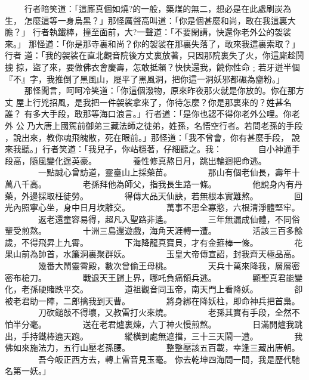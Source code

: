 \begin{pinyinscope}
{　　
行者暗笑道：「這廝真個如燒?的一般，築煤的無二，想必是在此處刷炭為生，
怎麼這等一身烏黑？」那怪厲聲高叫道：「你是個甚麼和尚，敢在我這裏大膽？」
行者執鐵棒，撞至面前，大?一聲道：「不要閑講，快還你老外公的袈裟來。」
那怪道：「你是那寺裏和尚？你的袈裟在那裏失落了，敢來我這裏索取？」行者
道：「我的袈裟在直北觀音院後方丈裏放著，只因那院裏失了火，你這廝趁鬨擄
掠，盜了來，要做佛衣會慶壽，怎敢抵賴？快快還我，饒你性命﹔若牙迸半個
『不』字，我推倒了黑風山，屣平了黑風洞，把你這一洞妖邪都碾為齏粉。」
　　
那怪聞言，呵呵冷笑道：「你這個潑物，原來昨夜那火就是你放的。你在那方丈
屋上行兇招風，是我把一件袈裟拿來了，你待怎麼？你是那裏來的？姓甚名誰？
有多大手段，敢那等海口浪言。」行者道：「是你也認不得你老外公哩。你老外
公 乃大唐上國駕前御弟三藏法師之徒弟，姓孫，名悟空行者。若問老孫的手段
，說出來，教你魂飛魄散，死在眼前。」那怪道：「我不曾會，你有甚麼手段，
說來我聽。」行者笑道：「我兒子，你站穩著，仔細聽之。我：
　　　　自小神通手段高，隨風變化逞英豪。
　　　　養性修真熬日月，跳出輪迴把命逃。
　　　　一點誠心曾訪道，靈臺山上採藥苗。
　　　　那山有個老仙長，壽年十萬八千高。
　　　　老孫拜他為師父，指我長生路一條。
　　　　他說身內有丹藥，外邊採取枉徒勞。
　　　　得傳大品天仙訣，若無根本實難熬。
　　　　回光內照寧心坐，身中日月坎離交。
　　　　萬事不思全寡慾，六根清淨體堅牢。
　　　　返老還童容易得，超凡入聖路非遙。
　　　　三年無漏成仙體，不同俗輩受煎熬。
　　　　十洲三島還遊戲，海角天涯轉一遭。
　　　　活該三百多餘歲，不得飛昇上九霄。
　　　　下海降龍真寶貝，才有金箍棒一條。
　　　　花果山前為帥首，水簾洞裏聚群妖。
　　　　玉皇大帝傳宣詔，封我齊天極品高。
　　　　幾番大鬧靈霄殿，數次曾偷王母桃。
　　　　天兵十萬來降我，層層密密布槍刀。
　　　　戰退天王歸上界，哪吒負痛領兵逃。
　　　　顯聖真君能變化，老孫硬賭跌平交。
　　　　道祖觀音同玉帝，南天門上看降妖。
　　　　卻被老君助一陣，二郎擒我到天曹。
　　　　將身綁在降妖柱，即命神兵把首梟。
　　　　刀砍鎚敲不得壞，又教雷打火來燒。
　　　　老孫其實有手段，全然不怕半分毫。
　　　　送在老君爐裏煉，六丁神火慢煎熬。
　　　　日滿開爐我跳出，手持鐵棒遶天跑。
　　　　縱橫到處無遮擋，三十三天鬧一遭。
　　　　我佛如來施法力，五行山壓老孫腰。
　　　　整整壓該五百載，幸逢三藏出唐朝。
　　　　吾今皈正西方去，轉上雷音見玉毫。
        你去乾坤四海問一問，我是歷代馳名第一妖。」

}
\end{pinyinscope}
